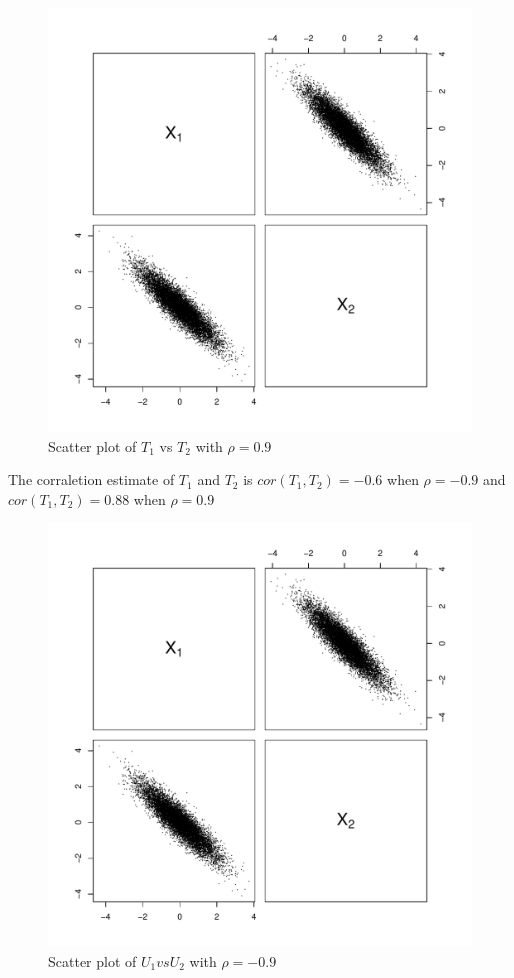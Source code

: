 \documentclass[a4paper, 11pt]{article}
\begin{document}
\begin{figure}[H]
  \centering
  \includegraphics[scale=0.7,page=5]{Rplots4.pdf}
  \caption{Scatter plot of $T_1$ vs $T_2$ with $\rho = 0.9$}
  \label{t1t2pos}
\end{figure}

The corraletion estimate of $T_1$ and $T_2$ is $cor(T_1,T_2) = -0.6$ when $\rho = -0.9$ and $cor(T_1,T_2) = 0.88$ when $\rho = 0.9$

\begin{figure}[H]
  \centering
  \includegraphics[scale=0.7,page=3]{Rplots4.pdf}
  \caption{Scatter plot of $U_1 vs U_2$ with $\rho = -0.9$}
  \label{u1u2neg}
\end{figure}
\end{document}
